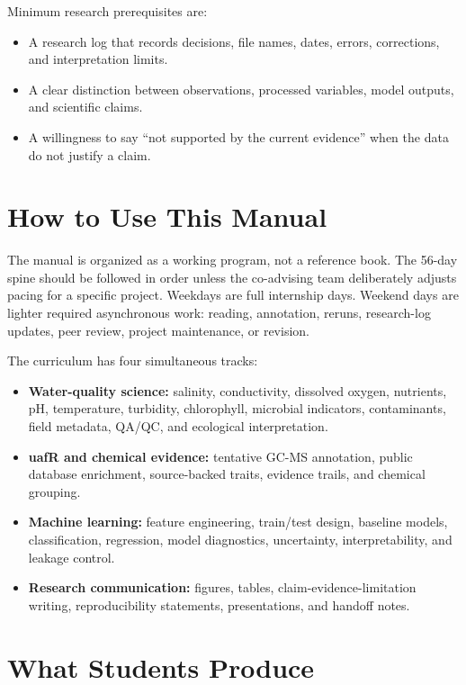 Minimum research prerequisites are:
\begin{itemize}
  \item A research log that records decisions, file names, dates, errors, corrections, and interpretation limits.
  \item A clear distinction between observations, processed variables, model outputs, and scientific claims.
  \item A willingness to say ``not supported by the current evidence'' when the data do not justify a claim.
\end{itemize}

\section{How to Use This Manual}

The manual is organized as a working program, not a reference book. The 56-day spine should be followed in order unless the co-advising team deliberately adjusts pacing for a specific project. Weekdays are full internship days. Weekend days are lighter required asynchronous work: reading, annotation, reruns, research-log updates, peer review, project maintenance, or revision.

The curriculum has four simultaneous tracks:
\begin{itemize}
  \item \textbf{Water-quality science:} salinity, conductivity, dissolved oxygen, nutrients, pH, temperature, turbidity, chlorophyll, microbial indicators, contaminants, field metadata, QA/QC, and ecological interpretation.
  \item \textbf{uafR and chemical evidence:} tentative GC-MS annotation, public database enrichment, source-backed traits, evidence trails, and chemical grouping.
  \item \textbf{Machine learning:} feature engineering, train/test design, baseline models, classification, regression, model diagnostics, uncertainty, interpretability, and leakage control.
  \item \textbf{Research communication:} figures, tables, claim-evidence-limitation writing, reproducibility statements, presentations, and handoff notes.
\end{itemize}

\section{What Students Produce}

